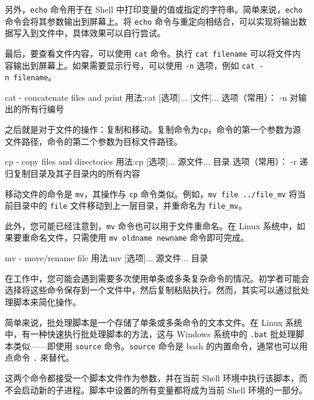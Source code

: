 另外，\texttt{echo} 命令用于在 Shell 中打印变量的值或指定的字符串。简单来说，\texttt{echo} 命令会将其参数输出到屏幕上。将 \texttt{echo} 命令与重定向相结合，可以实现将输出数据写入到文件中，具体效果可以自行尝试。

最后，要查看文件内容，可以使用 \texttt{cat} 命令。执行 \texttt{cat\ filename} 可以将文件内容输出到屏幕上。如果需要显示行号，可以使用 \texttt{-n} 选项，例如 \texttt{cat\ -n\ filename}。

\begin{CodeBlock}[language=BookShell]
cat - concatenate files and print
用法:cat [选项]... [文件]...
选项（常用）：
	-n 对输出的所有行编号
\end{CodeBlock}

之后就是对于文件的操作：复制和移动。复制命令为\texttt{cp}，命令的第一个参数为源文件路径，命令的第二个参数为目标文件路径。

\begin{CodeBlock}[language=BookShell]
cp - copy files and directories
用法:cp [选项]... 源文件... 目录
选项（常用）：
	-r 递归复制目录及其子目录内的所有内容
\end{CodeBlock}

移动文件的命令是 \texttt{mv}，其操作与 \texttt{cp} 命令类似。例如，\texttt{mv\ file\ ../file\_mv} 将当前目录中的 \texttt{file} 文件移动到上一层目录，并重命名为 \texttt{file\_mv}。

此外，您可能已经注意到，\texttt{mv} 命令也可以用于文件重命名。在 Linux 系统中，如果要重命名文件，只需使用 \texttt{mv\ oldname\ newname} 命令即可完成。

\begin{CodeBlock}[language=BookShell]
mv - move/rename file
用法:mv [选项]... 源文件... 目录
\end{CodeBlock}

在工作中，您可能会遇到需要多次使用单条或多条复杂命令的情况。初学者可能会选择将这些命令保存到一个文件中，然后复制粘贴执行。然而，其实可以通过批处理脚本来简化操作。

简单来说，批处理脚本是一个存储了单条或多条命令的文本文件。在 Linux 系统中，有一种快速执行批处理脚本的方法，这与 Windows 系统中的 \texttt{.bat} 批处理脚本类似------即使用 \texttt{source} 命令。\texttt{source} 命令是 bash 的内置命令，通常也可以用点命令 \texttt{.} 来替代。

这两个命令都接受一个脚本文件作为参数，并在当前 Shell 环境中执行该脚本，而不会启动新的子进程。脚本中设置的所有变量都将成为当前 Shell 环境的一部分。

